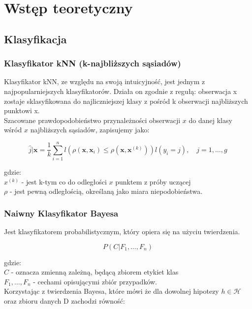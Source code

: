 \section{Wstęp teoretyczny}
\subsection{Klasyfikacja}
\subsubsection{Klasyfikator kNN (k-najbliższych sąsiadów) \cite{wyklad}}
Klasyfikator kNN, ze względu na swoją intuicyjność, jest jednym z najpopularniejszych klasyfikatorów. Działa on zgodnie z regułą: obserwacja x zostaje sklasyfikowana do najliczniejszej klasy z pośród k obserwacji najbliższych punktowi x.\\

Szacowane prawdopodobieństwo przynależności obserwacji ${x}$ do danej klasy wśród ${x}$ najbliższych sąsiadów, zapisujemy jako:

\begin{equation}
    \hat{j}|\mathbf{x} = \frac{1}{k} \sum_{i=1}^{n} l\left( \rho(\mathbf{x}, \mathbf{x}_i) \leq \rho(\mathbf{x}, \mathbf{x}^{(k)}) \right) l(y_i = j), \quad j = 1, \ldots, g
\end{equation}

gdzie:\\
${x}^{(k)}$ - jest k-tym co do odległości ${x}$ punktem z próby uczącej\\
$\rho$ - jest pewną odległością, określaną jako miara niepodobieństwa.

\subsubsection{Naiwny Klasyfikator Bayesa \cite{wyklad}}
Jest klasyfikatorem probabilistycznym, który opiera się na użyciu twierdzenia.

\begin{equation}
P(C|F_1, \ldots, F_n)
\end{equation}

gdzie:\\
$C$ - oznacza zmienną zależną, będącą zbiorem etykiet klas\\
 $F_1, \ldots, F_n$ - cechami opisującymi zbiór przypadków.\\

 Korzystając z twierdzenia Bayesa, które mówi że dla dowolnej hipotezy $h \in \mathcal{H}$ oraz zbioru danych D zachodzi równość:


